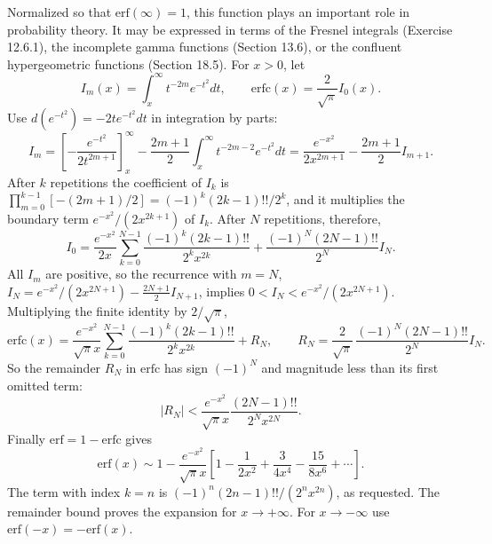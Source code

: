 Normalized so that $\mathrm{erf}(\infty)=1$, this function plays an important
role in probability theory. It may be expressed in terms of the Fresnel
integrals (Exercise 12.6.1), the incomplete gamma functions (Section 13.6),
or the confluent hypergeometric functions (Section 18.5).
\solution
For $x>0$, let
\[
I_m(x)=\int_x^\infty t^{-2m}e^{-t^2}dt,\qquad
\mathrm{erfc}(x)=\frac2{\sqrt\pi}I_0(x).
\]
Use $d(e^{-t^2})=-2t e^{-t^2}dt$ in integration by parts:
\[
I_m=\left[-\frac{e^{-t^2}}{2t^{2m+1}}\right]_x^\infty
-\frac{2m+1}{2}\int_x^\infty t^{-2m-2}e^{-t^2}dt
=\frac{e^{-x^2}}{2x^{2m+1}}-\frac{2m+1}{2}I_{m+1}.
\]
After $k$ repetitions the coefficient of $I_k$ is
$\prod_{m=0}^{k-1}[-(2m+1)/2]=(-1)^k(2k-1)!!/2^k$, and it multiplies
the boundary term $e^{-x^2}/(2x^{2k+1})$ of $I_k$. After $N$
repetitions, therefore,
\[
I_0=\frac{e^{-x^2}}{2x}
\sum_{k=0}^{N-1}\frac{(-1)^k(2k-1)!!}{2^kx^{2k}}
+\frac{(-1)^N(2N-1)!!}{2^N}I_N.
\]
All $I_m$ are positive, so the recurrence with $m=N$,
$I_N=e^{-x^2}/(2x^{2N+1})-\frac{2N+1}2I_{N+1}$, implies
$0<I_N<e^{-x^2}/(2x^{2N+1})$. Multiplying the finite identity by
$2/\sqrt\pi$,
\[
\mathrm{erfc}(x)=\frac{e^{-x^2}}{\sqrt\pi x}
\sum_{k=0}^{N-1}\frac{(-1)^k(2k-1)!!}{2^kx^{2k}}+R_N,\qquad
R_N=\frac2{\sqrt\pi}\,\frac{(-1)^N(2N-1)!!}{2^N}I_N.
\]
So the remainder $R_N$ in $\mathrm{erfc}$
has sign $(-1)^N$ and magnitude less than its first omitted term:
\[
|R_N|<\frac{e^{-x^2}}{\sqrt\pi x}
\frac{(2N-1)!!}{2^Nx^{2N}}.
\]
Finally $\mathrm{erf}=1-\mathrm{erfc}$ gives
\[
\boxed{\mathrm{erf}(x)\sim1-\frac{e^{-x^2}}{\sqrt\pi x}
\left[1-\frac1{2x^2}+\frac3{4x^4}-\frac{15}{8x^6}+\cdots\right]}.
\]
The term with index $k=n$ is
$(-1)^n(2n-1)!!/(2^nx^{2n})$, as requested.
The remainder bound proves the expansion for $x\to+\infty$.
For $x\to-\infty$ use $\mathrm{erf}(-x)=-\mathrm{erf}(x)$.

